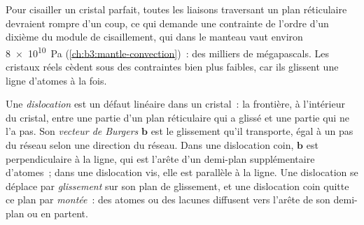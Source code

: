 Pour cisailler un cristal parfait, toutes les liaisons traversant un plan réticulaire
devraient rompre d'un coup, ce qui demande une contrainte de l'ordre d'un dixième du
module de cisaillement, qui dans le manteau vaut environ \qty{8e10}{Pa}
(\cref{ch:b3:mantle-convection})~: des milliers de mégapascals. Les cristaux réels
cèdent sous des contraintes bien plus faibles, car ils glissent une ligne d'atomes à la fois.

\begin{definition}[Dislocation]\label{def:b3:deformation-mechanisms:dislocation}
Une \emph{dislocation} est un défaut linéaire dans un
cristal~: la frontière, à l'intérieur du cristal, entre une partie d'un plan
réticulaire qui a glissé et une partie qui ne l'a pas. Son \emph{vecteur de Burgers}
$\mathbf b$ est le glissement qu'il transporte, égal à un pas du réseau selon une
direction du réseau. Dans une dislocation coin, $\mathbf b$ est perpendiculaire à la ligne,
qui est l'arête d'un demi-plan supplémentaire d'atomes~; dans une dislocation vis, elle
est parallèle à la ligne. Une dislocation se déplace par \emph{glissement} sur son plan de glissement,
et une dislocation coin quitte ce plan par \emph{montée}~: des atomes ou des
lacunes diffusent vers l'arête de son demi-plan ou en partent.
\end{definition}

